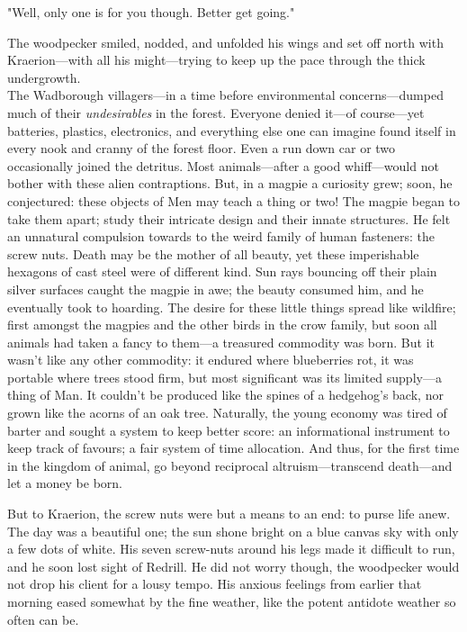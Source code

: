 "Well, only one is for you though. Better get going."

The woodpecker smiled, nodded, and unfolded his wings and set off north with Kraerion---with all his might---trying to keep up the pace through the thick undergrowth.\\

The Wadborough villagers---in a time before environmental concerns---dumped much of their \textit{undesirables} in the forest. Everyone denied it---of course---yet batteries, plastics, electronics, and everything else one can imagine found itself in every nook and cranny of the forest floor. Even a run down car or two occasionally joined the detritus. Most animals---after a good whiff---would not bother with these alien contraptions. But, in a magpie a curiosity grew; soon, he conjectured: these objects of Men may teach a thing or two! The magpie began to take them apart; study their intricate design and their innate structures. He felt an unnatural compulsion towards to the weird family of human fasteners: the screw nuts. Death may be the mother of all beauty, yet these imperishable hexagons of cast steel were of different kind. Sun rays bouncing off their plain silver surfaces caught the magpie in awe; the beauty consumed him, and he eventually took to hoarding. The desire for these little things spread like wildfire; first amongst the magpies and the other birds in the crow family, but soon all animals had taken a fancy to them---a treasured commodity was born. But it wasn't like any other commodity: it endured where blueberries rot, it was portable where trees stood firm, but most significant was its limited supply---a thing of Man. It couldn't be produced like the spines of a hedgehog's back, nor grown like the acorns of an oak tree. Naturally, the young economy was tired of barter and sought a system to keep better score: an informational instrument to keep track of favours; a fair system of time allocation. And thus, for the first time in the kingdom of animal, go beyond reciprocal altruism---transcend death---and let a money be born.  

But to Kraerion, the screw nuts were but a means to an end: to purse life anew. \\

The day was a beautiful one; the sun shone bright on a blue canvas sky with only a few dots of white. His seven screw-nuts around his legs made it difficult to run, and he soon lost sight of Redrill. He did not worry though, the woodpecker would not drop his client for a lousy tempo. His anxious feelings from earlier that morning eased somewhat by the fine weather, like the potent antidote weather so often can be. 

